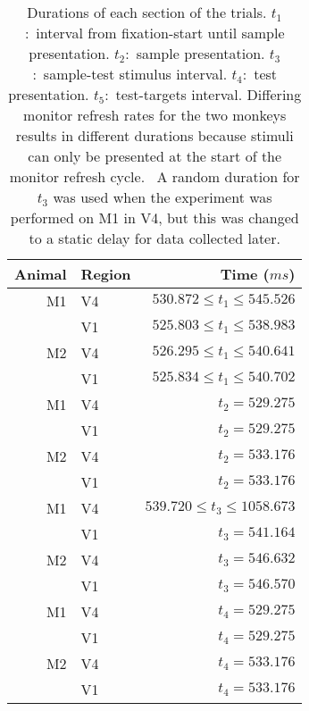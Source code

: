 \begin{table}[hbtp]
\caption{Durations of each section of the trials.
$t_1$:~interval from fixation-start until sample presentation.
$t_2$:~sample presentation.
$t_3$:~sample-test stimulus interval.
$t_4$:~test presentation.
$t_5$:~test-targets interval.
Differing monitor refresh rates for the two monkeys results in different durations because stimuli can only be presented at the start of the monitor refresh cycle.
\NB{}~A random duration for $t_3$ was used when the experiment was performed on M1 in V4, but this was changed to a static delay for data collected later.}
\label{tab:tptimes}
\begin{center}
\begin{tabular}{rlr}
\toprule
Animal  & Region & Time ($\unit{ms}$)
\\
\midrule
M1  & V4    & $530.872 \le t_1 \le 545.526$
\\
        & V1    & $525.803 \le t_1 \le 538.983$
\\
M2    & V4    & $526.295 \le t_1 \le 540.641$
\\
        & V1    & $525.834 \le t_1 \le 540.702$
\\
\midrule
M1  & V4    & $t_2 = 529.275$ 
\\
        & V1    & $t_2 = 529.275$
\\
M2    & V4    & $t_2 = 533.176$
\\
        & V1    & $t_2 = 533.176$
\\
\midrule
M1  & V4    & $539.720 \le t_3 \le 1058.673$
\\
        & V1    & $t_3 = 541.164$
\\
M2    & V4    & $t_3 = 546.632$
\\
        & V1    & $t_3 = 546.570$
\\
\midrule
M1  & V4    & $t_4 = 529.275$
\\
        & V1    & $t_4 = 529.275$
\\
M2    & V4    & $t_4 = 533.176$
\\
        & V1    & $t_4 = 533.176$

\end{tabular}
\end{center}
\end{table}
